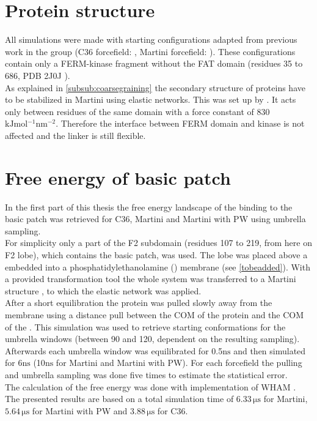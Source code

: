 \section{Protein structure}
All simulations were made with starting configurations adapted from previous work in the group (C36 forcefield: \textcite{pap003}, Martini forcefield: \textcite{SARA}). These configurations contain only a FERM-kinase fragment without the FAT domain (residues 35 to 686, PDB 2J0J \autocite{structFAK}).\\
As explained in \autoref{subsub:coarsegraining} the secondary structure of proteins have to be stabilized in Martini using elastic networks. This was set up by \textcite{SARA}. It acts only between residues of the same domain with a force constant of 830 $\si{\kilo\joule\mole^{-1}\nano\meter^{-2}}$. Therefore the interface between FERM domain and kinase is not affected and the linker is still flexible.
\section{Free energy of basic patch}
In the first part of this thesis the free energy landscape of the \pip{} binding to the basic patch was retrieved for C36, Martini and Martini with PW using umbrella sampling.\\
For simplicity only a part of the F2 subdomain (residues 107 to 219, from here on F2 lobe), which contains the basic patch, was used. The lobe was placed above a \pip{} embedded into a phosphatidylethanolamine (\pope{}) membrane (see \autoref{tobeadded}). With a provided transformation tool \autocite{backwardpy} the whole system was transferred to a Martini structure , to which the elastic network was applied.\\
After a short equilibration the protein was pulled slowly away from the membrane using a distance pull between the COM of the protein and the COM of the \pip{}. This simulation was used to retrieve starting conformations for the umbrella windows (between 90 and 120, dependent on the resulting sampling). Afterwards each umbrella window was equilibrated for 0.5$\si{\nano\second}$ and then simulated for 6$\si{\nano\second}$ (10$\si{\nano\second}$ for Martini and Martini with PW). For each forcefield the pulling and umbrella sampling was done five times to estimate the statistical error.\\
The calculation of the free energy was done with \gromacs{} implementation of WHAM \autocite{gromacsWHAMpaper}.
The presented results are based on a total simulation time of $6.33\,\si{\micro\second}$ for Martini, $5.64\,\si{\micro\second}$ for Martini with PW and $3.88\,\si{\micro\second}$ for C36. %
